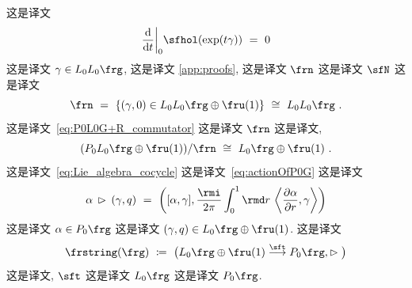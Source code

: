 \documentclass[
    affil-it, %
    auth-lg, %
    british, %
    compression, %
    contents, %
    custom-packages={}, %
    references={bigone}, %
]{lib/preprint}
\begin{document}
\begin{body}
 这是译文         \begin{equation}\label{eq:derhol}
            \dder{t}\bigg|_0\sfhol(\exp(t\gamma))\ =\ 0
        \end{equation}  这是译文 $\gamma\in L_0L_0\frg$, 这是译文 \cref{app:proofs}, 这是译文 $\frn$ 这是译文 $\sfN$ 这是译文         \begin{equation}
            \frn\ =\ \{(\gamma,0)\in L_0L_0\frg\oplus\fru(1)\}\ \cong\ L_0L_0\frg~.
        \end{equation}  这是译文~\eqref{eq:P0L0G+R_commutator} 这是译文 $ \frn $ 这是译文,         \begin{equation}
            (P_0L_0\frg\oplus\fru(1))/\frn\ \cong\ L_0\frg\oplus\fru(1)~.
        \end{equation}  这是译文~\eqref{eq:Lie_algebra_cocycle} 这是译文~\eqref{eq:actionOfP0G} 这是译文         \begin{equation}
            \alpha\,\acton\,(\gamma,q)\ =\ \left([\alpha,\gamma],\frac{\rmi}{2\pi}\int_0^1\rmd r\,\innerLarge{\parder[\alpha]{r}}{\gamma}\right)
        \end{equation}  这是译文 $\alpha\in P_0\frg$ 这是译文 $(\gamma,q)\in L_0\frg\oplus\fru(1)$. 这是译文~\cite{Baez:2005sn}         \begin{equation}\label{eq:strict_string_Lie_2_algebra}
            \frstring(\frg)\ \coloneqq\ \big(L_0\frg\oplus\fru(1)\overset{\sft}{\longrightarrow}P_0\frg,\acton\big)
        \end{equation}  这是译文, $\sft$ 这是译文 $L_0 \frg$ 这是译文 $P_0\frg$. 
        

\end{body}
\end{document}
